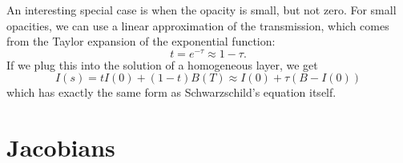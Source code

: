 \documentclass[a4paper,fleqn]{article}
\begin{document}
An interesting special case is when the opacity is small, but not zero. For small opacities, 
we can use a linear approximation of the transmission, which comes from the Taylor expansion
of the exponential function:
\begin{equation}
	t = e^{-\tau} \approx 1 - \tau.
\end{equation}
If we plug this into the solution of a homogeneous layer, we get
\begin{equation}
	I(s) = t I(0)  + \left( 1-t \right) B(T) \approx I(0) + \tau \left( B - I(0)\right)
\end{equation}
which has exactly the same form as Schwarzschild's equation itself.

\section{Jacobians}
 
\end{document}
